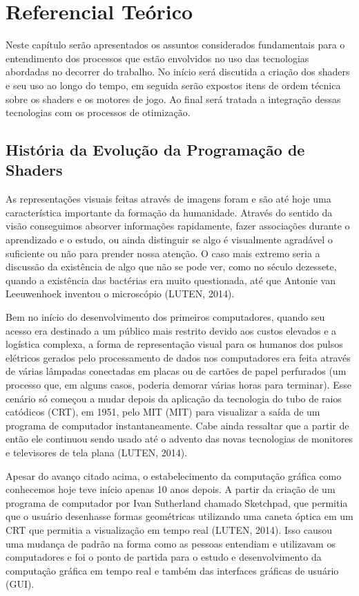 \chapter{Referencial Teórico}
\label{cap:referencial-teorico}

Neste capítulo serão apresentados os assuntos considerados fundamentais para o entendimento dos processos que estão envolvidos no uso das tecnologias abordadas no decorrer do trabalho. No início será discutida a criação dos shaders e seu uso ao longo do tempo, em seguida serão expostos itens de ordem técnica sobre os shaders e os motores de jogo. Ao final será tratada a integração dessas tecnologias com os processos de otimização.

\section{História da Evolução da Programação de Shaders}
\label{sec:historia-evolucao-programacao-shaders}

As representações visuais feitas através de imagens foram e são até hoje uma característica importante da formação da humanidade. Através do sentido da visão conseguimos absorver informações rapidamente, fazer associações durante o aprendizado e o estudo, ou ainda distinguir se algo é visualmente agradável o suficiente ou não para prender nossa atenção. O caso mais extremo seria a discussão da existência de algo que não se pode ver, como no século dezessete, quando a existência das bactérias era muito questionada, até que Antonie van Leeuwenhoek inventou o microscópio (LUTEN, 2014)\nocite{openGLBook}.

Bem no início do desenvolvimento dos primeiros computadores, quando seu acesso era destinado a um público mais restrito devido aos custos elevados e a logística complexa, a forma de representação visual para os humanos dos pulsos elétricos gerados pelo processamento de dados nos computadores era feita através de várias lâmpadas conectadas em placas ou de cartões de papel perfurados (um processo que, em alguns casos, poderia demorar várias horas para terminar). Esse cenário só começou a mudar depois da aplicação da tecnologia do tubo de raios catódicos (\acrshort{CRT}), em 1951, pelo MIT (\acrlong{MIT}) para visualizar a saída de um programa de computador instantaneamente. Cabe ainda ressaltar que a partir de então ele continuou sendo usado até o advento das novas tecnologias de monitores e televisores de tela plana (LUTEN, 2014)\nocite{openGLBook}.

Apesar do avanço citado acima, o estabelecimento da computação gráfica como conhecemos hoje teve início apenas 10 anos depois. A partir da criação de um programa de computador por Ivan Sutherland chamado Sketchpad, que permitia que o usuário desenhasse formas geométricas utilizando uma caneta óptica em um \acrshort{CRT} que permitia a visualização em tempo real (LUTEN, 2014)\nocite{openGLBook}. Isso causou uma mudança de padrão na forma como as pessoas entendiam e utilizavam os computadores e foi o ponto de partida para o estudo e desenvolvimento da computação gráfica em tempo real e também das interfaces gráficas de usuário (\acrshort{GUI}).

